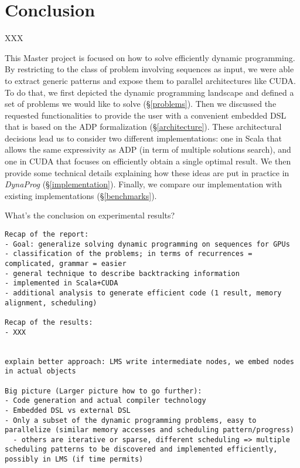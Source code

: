 \section{Conclusion}
{\color{red} XXX}

This Master project is focused on how to solve efficiently dynamic programming. By restricting to the class of problem involving sequences as input, we were able to extract generic patterns and expose them to parallel architectures like CUDA. To do that, we first depicted the dynamic programming landscape and defined a set of problems we would like to solve (\S\ref{problems}). Then we discussed the requested functionalities to provide the user with a convenient embedded DSL that is based on the ADP formalization (\S\ref{architecture}). These architectural decisions lead us to consider two different implementations: one in Scala that allows the same expressivity as ADP (in term of multiple solutions search), and one in CUDA that focuses on efficiently obtain a single optimal result. We then provide some technical details explaining how these ideas are put in practice in \textit{DynaProg} (\S\ref{implementation}). Finally, we compare our implementation with existing implementations (\S\ref{benchmarks}).

{\color{red} What's the conclusion on experimental results?}


\begin{verbatim}
Recap of the report:
- Goal: generalize solving dynamic programming on sequences for GPUs
- classification of the problems; in terms of recurrences = complicated, grammar = easier
- general technique to describe backtracking information
- implemented in Scala+CUDA
- additional analysis to generate efficient code (1 result, memory alignment, scheduling)

Recap of the results:
- XXX


explain better approach: LMS write intermediate nodes, we embed nodes in actual objects

Big picture (Larger picture how to go further):
- Code generation and actual compiler technology
- Embedded DSL vs external DSL
- Only a subset of the dynamic programming problems, easy to parallelize (similar memory accesses and scheduling pattern/progress)
  - others are iterative or sparse, different scheduling => multiple scheduling patterns to be discovered and implemented efficiently, possibly in LMS (if time permits)

\end{verbatim}
